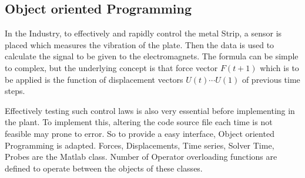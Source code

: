 \documentclass[main.tex]{subfiles}
\begin{document}
\begin{comment}

[\textbf{insert simulink strucutr}]




\begin{equation}
u = \overline{u} e^{i \omega t}
\end{equation}

$\overline{u}$ is the natural mode. $\omega$ is the natural mode of the system.

using orthoganlity [\textbf{bla bla bla}], the system is reduced into as

\begin{equation}
 \left[  \overline{ K } \right]  =   \left\{ \overline{u}  \right\} ^ T
 \left[K\right] 
  \left\{ \overline{u}  \right\} 
\end{equation}

\begin{equation}
 \left[  \overline{ C } \right]  =   \left\{ \overline{u}  \right\} ^ T
 \left[C\right] 
  \left\{ \overline{u}  \right\} 
\end{equation}

\begin{equation}
 \left[  \overline{ M } \right]  =   \left\{ \overline{u}  \right\} ^ T
 \left[M\right] 
  \left\{ \overline{u}  \right\} 
\end{equation}

[write full reduced ODE]

By doing this, the efficiency of the system increases drastically. 

\end{comment}
\subsection{Object oriented Programming}

In the Industry, to effectively and rapidly control the metal Strip, a sensor is placed which measures the vibration of the plate. Then the data is used to calculate the signal to be given to the electromagnets. The formula can be simple to complex, but the underlying concept is that force vector $F(t+1)$ which is to be applied is the function of displacement vectors $U(t) \cdots U(1)$ of previous time steps.




Effectively testing such control laws is also very essential before implementing in the plant. To implement this, altering the code source file each time is not feasible may prone to error. So to provide a easy interface, Object oriented Programming is adapted. Forces, Displacements, Time series, Solver Time, Probes are the Matlab class. Number of Operator overloading functions are defined to operate between the objects of these classes. 
\end{document}
